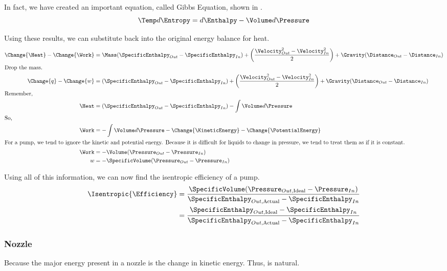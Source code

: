 In fact, we have created an important equation, called Gibbs Equation, shown in .
\begin{equation}\label{eq:Gibbs_Equation}
  \Temp d\Entropy = d\Enthalpy - \Volume d\Pressure
\end{equation}

Using these results, we can substitute back into the original energy balance for heat.
\begin{align*}
  \Change{\Heat} - \Change{\Work} &= \Mass (\SpecificEnthalpy_{Out} - \SpecificEnthalpy_{In}) + \left( \frac{\Velocity_{Out}^{2} - \Velocity_{In}^{2}}{2} \right) + \Gravity (\Distance_{Out} - \Distance_{In}) \\
  \shortintertext{Drop the mass.}
  \Change{q} - \Change{w} &= (\SpecificEnthalpy_{Out} - \SpecificEnthalpy_{In}) + \left( \frac{\Velocity_{Out}^{2} - \Velocity_{In}^{2}}{2} \right) + \Gravity (\Distance_{Out} - \Distance_{In}) \\
  \shortintertext{Remember,}
  \Heat &= (\SpecificEnthalpy_{Out} - \SpecificEnthalpy_{In}) - \int \Volume d\Pressure \\
  \shortintertext{So,}
  \Work &= -\int \Volume d\Pressure - \Change{\KineticEnergy} - \Change{\PotentialEnergy} \\
  \intertext{For a pump, we tend to ignore the kinetic and potential energy.
  Because it is difficult for liquids to change in pressure, we tend to treat them as if it is constant.}
  \Work &= -\Volume (\Pressure_{Out}- \Pressure_{In}) \\
  w &= -\SpecificVolume (\Pressure_{Out}- \Pressure_{In})
\end{align*}

Using all of this information, we can now find the isentropic efficiency of a pump.
\begin{equation}\label{eq:Isentropic_Efficiency-Pump}
  \begin{aligned}
    \Isentropic{\Efficiency} &= \frac{\SpecificVolume (\Pressure_{Out, \text{Ideal}} - \Pressure_{In})}{\SpecificEnthalpy_{Out, \text{Actual}} - \SpecificEnthalpy_{In}} \\
    &= \frac{\SpecificEnthalpy_{Out, \text{Ideal}} - \SpecificEnthalpy_{In}}{\SpecificEnthalpy_{Out, \text{Actual}} - \SpecificEnthalpy_{In}}
  \end{aligned}
\end{equation}

\subsubsection{Nozzle}\label{subsubsec:Nozzle_Isentropic_Efficiency}
Because the major energy present in a nozzle is the change in kinetic energy.
Thus,  is natural.

